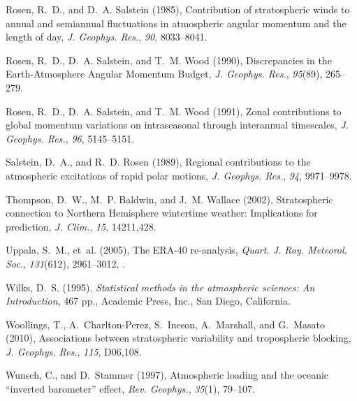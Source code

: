 \documentclass[draft,jgrga]{agutex}
\begin{document}
\begin{article}
\begin{thebibliography}{38}
Rosen, R.~D., and D.~A. Salstein (1985), Contribution of stratospheric winds to
  annual and semiannual fluctuations in atmospheric angular momentum and the
  length of day, \textit{J. Geophys. Res.}, \textit{90}, 8033--8041.

Rosen, R.~D., D.~A. Salstein, and T.~M. Wood (1990), {Discrepancies in the
  Earth-Atmosphere Angular Momentum Budget}, \textit{J. Geophys. Res.},
  \textit{95}(89), 265--279.

Rosen, R.~D., D.~A. Salstein, and T.~M. Wood (1991), Zonal contributions to
  global momentum variations on intraseasonal through interannual timescales,
  \textit{J. Geophys. Res.}, \textit{96}, 5145--5151.

Salstein, D.~A., and R.~D. Rosen (1989), Regional contributions to the
  atmospheric excitations of rapid polar motions, \textit{J. Geophys. Res.},
  \textit{94}, 9971--9978.

Thompson, D.~W., M.~P. Baldwin, and J.~M. Wallace (2002), Stratospheric
  connection to {Northern Hemisphere} wintertime weather: {Implications} for
  prediction, \textit{J. Clim.}, \textit{15}, 14211,428.

Uppala, S.~M., et~al. (2005), The {ERA}-40 re-analysis, \textit{Quart. J. Roy.
  Meteorol. Soc.}, \textit{131}(612), 2961--3012, .

Wilks, D.~S. (1995), \textit{Statistical methods in the atmospheric sciences:
  An Introduction}, 467 pp., Academic Press, Inc., San Diego, California.

Woollings, T., A.~Charlton-Perez, S.~Ineson, A.~Marshall, and G.~Masato (2010),
  Associations between stratospheric variability and tropospheric blocking,
  \textit{J. Geophys. Res.}, \textit{115}, D06,108.

Wunsch, C., and D.~Stammer (1997), Atmospheric loading and the oceanic
  ``inverted barometer'' effect, \textit{Rev. Geophys.}, \textit{35}(1),
  79--107.


\end{thebibliography}
\end{article}
\end{document}
